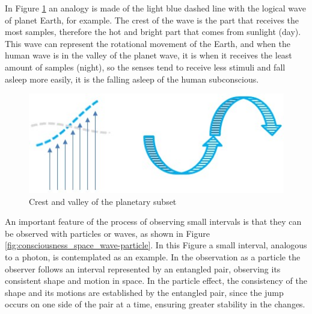 In Figure \ref{fig:consciousness_amplitude_crest_valley} an analogy is made of the light blue dashed line with the logical wave of planet Earth, for example. The crest of the wave is the part that receives the most samples, therefore the hot and bright part that comes from sunlight (day). This wave can represent the rotational movement of the Earth, and when the human wave is in the valley of the planet wave, it is when it receives the least amount of samples (night), so the senses tend to receive less stimuli and fall asleep more easily, it is the falling asleep of the human subconscious.
	\begin{figure}[H]
	\caption{Crest and valley of the planetary subset}
	\label{fig:consciousness_amplitude_crest_valley}
	\centering
	\includegraphics[scale=.6]{sections/images/consciousness_amplitude_crest_valley.jpg}
	\end{figure}

An important feature of the process of observing small intervals is that they can be observed with particles or waves, as shown in Figure \ref{fig:consciousness_space_wave-particle}. In this Figure a small interval, analogous to a photon, is contemplated as an example. In the observation as a particle the observer follows an interval represented by an entangled pair, observing its consistent shape and motion in space. In the particle effect, the consistency of the shape and its motions are established by the entangled pair, since the jump occurs on one side of the pair at a time, ensuring greater stability in the changes.

